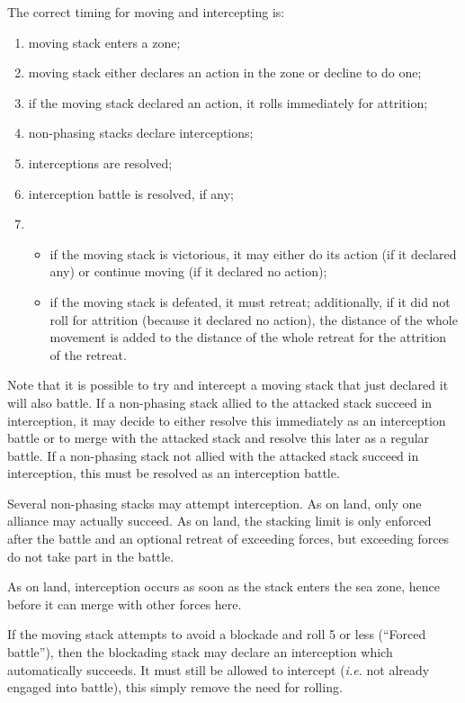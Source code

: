The correct timing for moving and intercepting is:
\begin{enumerate}
\item moving stack enters a zone;
\item moving stack either declares an action in the zone or decline to do one;
\item if the moving stack declared an action, it rolls immediately for
  attrition;
\item non-phasing stacks declare interceptions;
\item interceptions are resolved;
\item interception battle is resolved, if any;
\item
  \begin{itemize}
  \item if the moving stack is victorious, it may either do its action (if it
    declared any) or continue moving (if it declared no action);
  \item if the moving stack is defeated, it must retreat; additionally, if it
    did not roll for attrition (because it declared no action), the distance
    of the whole movement is added to the distance of the whole retreat for
    the attrition of the retreat.
  \end{itemize}
\end{enumerate}

Note that it is possible to try and intercept a moving stack that just
declared it will also battle. If a non-phasing stack allied to the attacked
stack succeed in interception, it may decide to either resolve this
immediately as an interception battle or to merge with the attacked stack and
resolve this later as a regular battle. If a non-phasing stack not allied with
the attacked stack succeed in interception, this must be resolved as an
interception battle.

Several non-phasing stacks may attempt interception. As on land, only one
alliance may actually succeed. As on land, the stacking limit is only enforced
after the battle and an optional retreat of exceeding forces, but exceeding
forces do not take part in the battle.

As on land, interception occurs as soon as the stack enters the sea zone,
hence before it can merge with other forces here.

If the moving stack attempts to avoid a blockade and roll 5 or less (``Forced
battle''), then the blockading stack may declare an interception which
automatically succeeds. It must still be allowed to intercept (\emph{i.e.} not
already engaged into battle), this simply remove the need for rolling.

